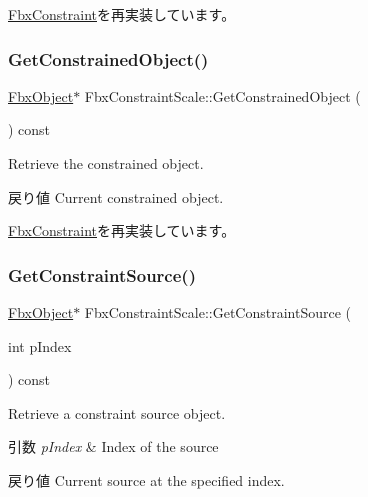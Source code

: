 \hyperlink{class_fbx_constraint_a0470a25b813b337d07a03ce4b97b44f8}{Fbx\+Constraint}を再実装しています。

\mbox{\label{class_fbx_constraint_scale_a1dcbdc6b41d04d6a75ca47f024e05dc9}} 
\subsubsection{\texorpdfstring{Get\+Constrained\+Object()}{GetConstrainedObject()}}
{\footnotesize\ttfamily \hyperlink{class_fbx_object}{Fbx\+Object}$\ast$ Fbx\+Constraint\+Scale\+::\+Get\+Constrained\+Object (\begin{DoxyParamCaption}{ }\end{DoxyParamCaption}) const\hspace{0.3cm}{\ttfamily [virtual]}}

Retrieve the constrained object. \begin{DoxyReturn}{戻り値}
Current constrained object. 
\end{DoxyReturn}


\hyperlink{class_fbx_constraint_a7f587d5db9685b5ee925a85354263edc}{Fbx\+Constraint}を再実装しています。

\mbox{\label{class_fbx_constraint_scale_ac957fc33cab352ef355602fb4325c5b7}} 
\subsubsection{\texorpdfstring{Get\+Constraint\+Source()}{GetConstraintSource()}}
{\footnotesize\ttfamily \hyperlink{class_fbx_object}{Fbx\+Object}$\ast$ Fbx\+Constraint\+Scale\+::\+Get\+Constraint\+Source (\begin{DoxyParamCaption}\item[{int}]{p\+Index }\end{DoxyParamCaption}) const\hspace{0.3cm}{\ttfamily [virtual]}}

Retrieve a constraint source object. 
\begin{DoxyParams}{引数}
{\em p\+Index} & Index of the source \\
\hline
\end{DoxyParams}
\begin{DoxyReturn}{戻り値}
Current source at the specified index. 
\end{DoxyReturn}


